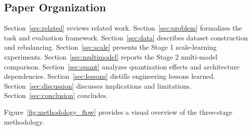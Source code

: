 \documentclass[twocolumn]{article}
\begin{document}
\subsection{Paper Organization}

Section~\ref{sec:related} reviews related work.
Section~\ref{sec:problem} formalizes the task and evaluation framework.
Section~\ref{sec:data} describes dataset construction and rebalancing.
Section~\ref{sec:scale} presents the Stage 1 scale-learning experiments.
Section~\ref{sec:multimodel} reports the Stage 2 multi-model comparison.
Section~\ref{sec:quant} analyzes quantization effects and architecture dependencies.
Section~\ref{sec:lessons} distills engineering lessons learned.
Section~\ref{sec:discussion} discusses implications and limitations.
Section~\ref{sec:conclusion} concludes.

Figure~\ref{fig:methodology_flow} provides a visual overview of the three-stage methodology.
\end{document}
